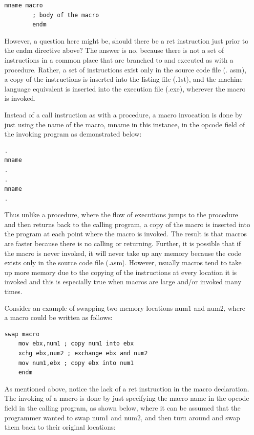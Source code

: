 \documentclass[10pt]{book}
\begin{document}
\begin{verbatim}
mname macro
        ; body of the macro
        endm
\end{verbatim}

However, a question here might be, should there be a ret instruction just prior to the endm directive above? The answer is no, because there is not a set of instructions in a common place that are branched to and executed as with a procedure. Rather, a set of instructions exist only in the source code file (. asm), a copy of the instructions is inserted into the listing file (.1st), and the machine language equivalent is inserted into the execution file (.exe), wherever the macro is invoked.

Instead of a call instruction as with a procedure, a macro invocation is done by just using the name of the macro, mname in this instance, in the opcode field of the invoking program as demonstrated below:
\begin{verbatim}
.
mname
.
.
mname
.
\end{verbatim}

Thus unlike a procedure, where the flow of executions jumps to the procedure and then returns back to the calling program, a copy of the macro is inserted into the program at each point where the macro is invoked. The result is that macros are faster because there is no calling or returning. Further, it is possible that if the macro is never invoked, it will never take up any memory because the code exists only in the source code file (.asm). However, usually macros tend to take up more memory due to the copying of the instructions at every location it is invoked and this is especially true when macros are large and/or invoked many times.

Consider an example of swapping two memory locations num1 and num2, where a macro could be written as follows:

\begin{verbatim}
swap macro
    mov ebx,num1 ; copy num1 into ebx
    xchg ebx,num2 ; exchange ebx and num2
    mov num1,ebx ; copy ebx into num1
    endm
\end{verbatim}

As mentioned above, notice the lack of a ret instruction in the macro declaration. The invoking of a macro is done by just specifying the macro name in the opcode field in the calling program, as shown below, where it can be assumed that the programmer wanted to swap num1 and num2, and then turn around and swap them back to their original locations:
\end{document}
